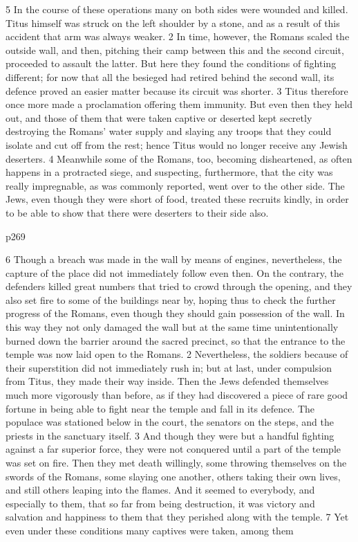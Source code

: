 5
In the course of these operations many on both sides were wounded and killed. Titus himself was struck on the left shoulder by a stone, and as a result of this accident that arm was always weaker. 2 In time, however, the Romans scaled the outside wall, and then, pitching their camp between this and the second circuit, proceeded to assault the latter. But here they found the conditions of fighting different; for now that all the besieged had retired behind the second wall, its defence proved an easier matter because its circuit was shorter. 3 Titus therefore once more made a proclamation offering them immunity. But even then they held out, and those of them that were taken captive or deserted kept secretly destroying the Romans' water supply and slaying any troops that they could isolate and cut off from the rest; hence Titus would no longer receive any Jewish deserters. 4 Meanwhile some of the Romans, too, becoming disheartened, as often happens in a protracted siege, and suspecting, furthermore, that the city was really impregnable, as was commonly reported, went over to the other side. The Jews, even though they were short of food, treated these recruits kindly, in order to be able to show that there were deserters to their side also.

p269

6
Though a breach was made in the wall by means of engines, nevertheless, the capture of the place did not immediately follow even then. On the contrary, the defenders killed great numbers that tried to crowd through the opening, and they also set fire to some of the buildings near by, hoping thus to check the further progress of the Romans, even though they should gain possession of the wall. In this way they not only damaged the wall but at the same time unintentionally burned down the barrier around the sacred precinct, so that the entrance to the temple was now laid open to the Romans. 2 Nevertheless, the soldiers because of their superstition did not immediately rush in; but at last, under compulsion from Titus, they made their way inside. Then the Jews defended themselves much more vigorously than before, as if they had discovered a piece of rare good fortune in being able to fight near the temple and fall in its defence. The populace was stationed below in the court, the senators on the steps, and the priests in the sanctuary itself. 3 And though they were but a handful fighting against a far superior force, they were not conquered until a part of the temple was set on fire. Then they met death willingly, some throwing themselves on the swords of the Romans, some slaying one another, others taking their own lives, and still others leaping into the flames. And it seemed to everybody, and especially to them, that so far from being destruction, it was victory and salvation and happiness to them that they perished along with the temple. 7 Yet even under these conditions many captives were taken, among them

